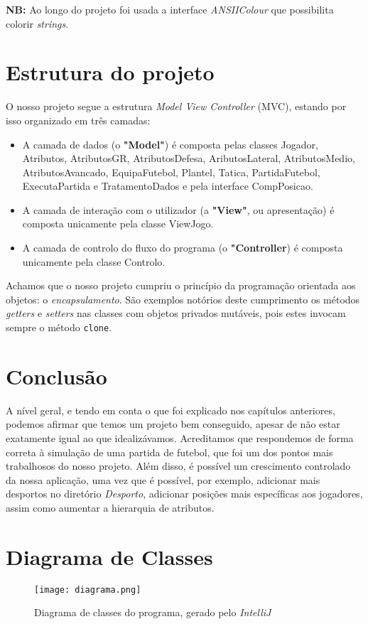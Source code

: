 \documentclass[a4paper]{report}
\begin{document}
\par \par
    \textbf{NB:} Ao longo do projeto foi usada a interface \textit{ANSIIColour} que possibilita colorir \textit{strings}.

	\chapter{Estrutura do projeto}
	
	O nosso projeto segue a estrutura \textit{Model View Controller} (MVC), estando por isso organizado em três camadas:
	\begin{itemize}
		\item A camada de dados (o \textbf{"Model"}) é composta pelas classes Jogador, Atributos, AtributosGR, AtributosDefesa, AributosLateral, AtributosMedio, AtributosAvancado, EquipaFutebol, Plantel, Tatica, PartidaFutebol, ExecutaPartida e TratamentoDados e pela interface CompPosicao.
		\item A camada de interação com o utilizador (a \textbf{"View"}, ou apresentação) é composta unicamente pela classe ViewJogo.
		\item A camada de controlo do fluxo do programa (o \textbf{"Controller}) é composta unicamente pela classe Controlo.
	\end{itemize}
	
	Achamos que o nosso projeto cumpriu o princípio da programação orientada aos objetos: o \textit{encapsulamento}. São exemplos notórios deste cumprimento os métodos \textit{getters} e \textit{setters} nas classes com objetos privados mutáveis, pois estes invocam sempre o método \texttt{clone}.
    
      

	
	

	\chapter{Conclusão}

	A nível geral, e tendo em conta o que foi explicado nos capítulos anteriores, podemos afirmar que temos um projeto bem conseguido, apesar de não estar exatamente igual ao que idealizávamos. Acreditamos que respondemos de forma correta à simulação de uma partida de futebol, que foi um dos pontos mais trabalhosos do nosso projeto. Além disso, é possível um crescimento controlado da nossa aplicação, uma vez que é possível, por exemplo, adicionar mais desportos no diretório \textit{Desporto}, adicionar posições mais específicas aos jogadores, assim como aumentar a hierarquia de atributos.
	
	\appendix
	
	\chapter{Diagrama de Classes}
	\begin{figure}[H]
		\begin{center}
			\texttt{[image: diagrama.png]}
			\caption{Diagrama de classes do programa, gerado pelo \emph{IntelliJ}}
		\end{center}
	\end{figure}
\end{document}

